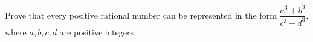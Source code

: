 Prove that every positive rational number can be represented in the form $\dfrac{a^3 + b^3}{c^3 + d^3}$, where $a, b, c, d$ are positive integers.
